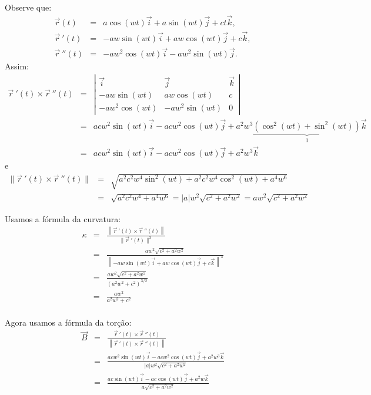 \begin{resol}
 Observe que:
\begin{eqnarray*}
\vec{r}(t)&=&a\cos(wt)\vec{i}+a\sin(wt)\vec{j}+ct\vec{k},\\
\vec{r}~\!'(t)&=&-aw\sin(wt)\vec{i}+aw\cos(wt)\vec{j}+c\vec{k},\\
\vec{r}~\!''(t)&=&-aw^2\cos(wt)\vec{i}-aw^2\sin(wt)\vec{j}.
\end{eqnarray*}
Assim:
\begin{eqnarray*}
\vec{r}~\!'(t)\times \vec{r}~\!''(t)&=&\left|
\begin{array}{ccc}
\vec{i}&\vec{j}&\vec{k}\\[0.5cm]
-aw\sin(wt)&aw\cos(wt)&c\\[0.5cm]
-aw^2\cos(wt)&-aw^2\sin(wt)&0
\end{array}
\right|\\
&=&
acw^2\sin(wt)\vec{i}-acw^2\cos(wt)\vec{j}+a^2w^3\underbrace{\left(\cos^2(wt)+\sin^2(wt)\right)}_{1}\vec{k}\\
&=&acw^2\sin(wt)\vec{i}-acw^2\cos(wt)\vec{j}+a^2w^3\vec{k}
\end{eqnarray*}
e
\begin{eqnarray*}
\|\vec{r}~\!'(t)\times \vec{r}~\!''(t)\|&=&\sqrt{a^2c^2w^4\sin^2(wt)+a^2c^2w^4\cos^2(wt)+a^4w^6}\\
&=&\sqrt{a^2c^2w^4+a^4w^6}=|a|w^2\sqrt{c^2+a^2w^2}=aw^2\sqrt{c^2+a^2w^2}
\end{eqnarray*}

Usamos a fórmula da curvatura:
\begin{eqnarray*}\kappa &=& \frac{\left\|\vec{r}~\!'(t)\times \vec{r}~\!''(t)\right\|}{\|\vec{r}~\!'(t)\|^3}\\
&=&\frac{aw^2\sqrt{c^2+a^2w^2}}{\left\|-aw\sin(wt)\vec{i}+aw\cos(wt)\vec{j}+c\vec{k}\right\|^3}\\
&=&\frac{aw^2\sqrt{c^2+a^2w^2}}{\left(a^2w^2+c^2\right)^{3/2}}\\
&=&\frac{aw^2}{{a^2w^2+c^2}}\\
\end{eqnarray*}


Agora usamos a fórmula da torção:
\begin{eqnarray*}\vec{B}&=&\frac{\vec{r}~\!'(t)\times \vec{r}~\!''(t)}{\left\|\vec{r}~\!'(t)\times \vec{r}~\!''(t)\right\|}\\
&=&\frac{acw^2\sin(wt)\vec{i}-acw^2\cos(wt)\vec{j}+a^2w^3\vec{k}}{|a|w^2\sqrt{c^2+a^2w^2}}\\
&=&\frac{ac\sin(wt)\vec{i}-ac\cos(wt)\vec{j}+a^2w\vec{k}}{a\sqrt{c^2+a^2w^2}}
\end{eqnarray*}


\end{resol}
